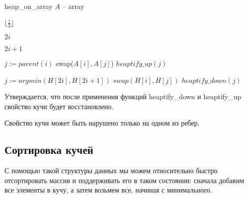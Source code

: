 \documentclass[../main.tex]{subfiles}
\begin{document}
	\begin{struct}{heap\_on\_array}
		\State $A$ -- array
		
			\State \Return $\lfloor\frac{i}{2}\rfloor$ 
		\EndFunction
		
		\State
		
			\State \Return $2i$
		\EndFunction
		
		\State
		
			\State \Return $2i + 1$
		\EndFunction
		
		\State 
		
				\State $j := parent(i)$
					\State swap($A[i], A[j]$)
					\State $heaptify\_up(j)$
				\EndIf
			\EndIf
		\EndFunction
		
		\State
		
				\State $j := argmin(H[2i], H[2i +1])$
					\State $swap(H[i], H[j])$
					\State $heaptify\_down(j)$				
				\EndIf
			\EndIf
		\EndFunction
	\end{struct}
	
	Утверждается, что после применения функций heaptify\_down и heaptify\_up свойство кучи будет восстановлено.
	
	\begin{statement}
		Свойство кучи может быть нарушено только на одном из ребер.
	\end{statement}

	
	\subsection{Сортировка кучей}
	С помощью такой структуры данных мы можем относительно быстро отсортировать массив и поддерживать его в таком состоянии: сначала добавим все элементы в кучу, а затем возьмем все, начиная с минимального.
	
	\pagebreak
\end{document}
